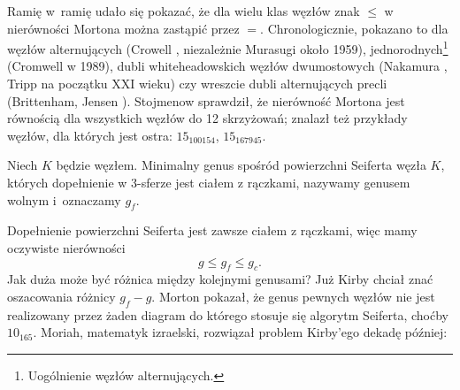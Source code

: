 Ramię w~ramię udało się pokazać, że dla wielu klas węzłów znak $\le$ w nierówności Mortona można zastąpić przez $=$.
Chronologicznie, pokazano to dla węzłów alternujących (Crowell \cite{crowellrichard59}, niezależnie Murasugi \cite{murasugi58} około 1959),
%
%
%
jednorodnych\footnote{Uogólnienie węzłów alternujących.} (Cromwell \cite{cromwell89} w 1989),
%
%
dubli whiteheadowskich węzłów dwumostowych (Nakamura \cite{nakamura06}, Tripp \cite{tripp02} na początku XXI wieku)
%
%
%
%
czy wreszcie dubli alternujących precli (Brittenham, Jensen \cite{brittenham06}).
%
%
%
Stojmenow \cite{stoimenow02} sprawdził, że nierówność Mortona jest równością dla wszystkich węzłów do 12 skrzyżowań; znalazł też przykłady węzłów, dla których jest ostra: $15_{100154}$, $15_{167945}$.
%

\begin{definition}
%
%
    Niech $K$ będzie węzłem.
    Minimalny genus spośród powierzchni Seiferta węzła $K$, których dopełnienie w 3-sferze jest ciałem z rączkami, nazywamy genusem wolnym i~oznaczamy $g_f$.
\end{definition}

Dopełnienie powierzchni Seiferta jest zawsze ciałem z rączkami, więc mamy oczywiste nierówności
\begin{equation}
    g \le g_f \le g_c.
\end{equation}
Jak duża może być różnica między kolejnymi genusami?
Już Kirby \cite[problem 1.20a]{kirby78} chciał znać oszacowania różnicy $g_f - g$.
Morton \cite{morton86} pokazał, że genus pewnych węzłów nie jest realizowany przez żaden diagram do którego stosuje się algorytm Seiferta, choćby $10_{165}$.
%
Moriah, matematyk izraelski, rozwiązał problem Kirby'ego dekadę później:
%


